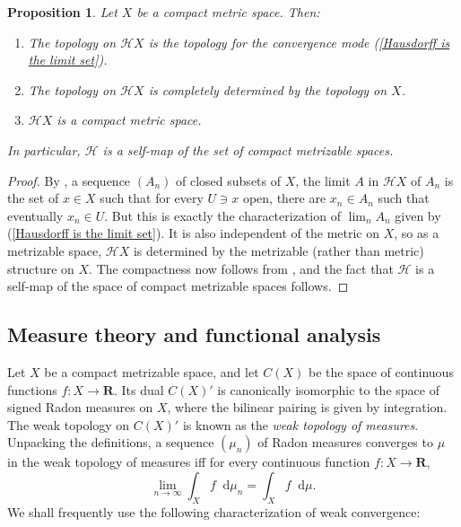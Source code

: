 \documentclass[reqno,11pt]{amsart}
\newcommand{\RR}{\mathbf{R}}
\newcommand*\dif{\mathop{}\!\mathrm{d}}
\newcommand{\Hypspace}{\mathscr H}
\newcommand{\dfn}[1]{\emph{#1}\index{#1}}
\newtheorem{proposition}[theorem]{Proposition}
\theoremstyle{definition}
\numberwithin{equation}{section}
\begin{document}
\begin{proposition}\label{Hausdorff on a CMS}
Let $X$ be a compact metric space. Then:
\begin{enumerate}
\item The topology on $\Hypspace X$ is the topology for the convergence mode (\ref{Hausdorff is the limit set}).
\item The topology on $\Hypspace X$ is completely determined by the topology on $X$.
\item $\Hypspace X$ is a compact metric space.
\end{enumerate}
In particular, $\Hypspace$ is a self-map of the set of compact metrizable spaces.
\end{proposition}
\begin{proof}
By \cite[Theorem 4.11]{nadler2017continuum}, a sequence $(A_n)$ of closed subsets of $X$, the limit $A$ in $\Hypspace X$ of $A_n$ is the set of $x \in X$ such that for every $U \ni x$ open, there are $x_n \in A_n$ such that eventually $x_n \in U$.
But this is exactly the characterization of $\lim_n A_n$ given by (\ref{Hausdorff is the limit set}).
It is also independent of the metric on $X$, so as a metrizable space, $\Hypspace X$ is determined by the metrizable (rather than metric) structure on $X$.
The compactness now follows from \cite[Theorem 4.17]{nadler2017continuum}, and the fact that $\Hypspace$ is a self-map of the space of compact metrizable spaces follows.
\end{proof}

\subsection{Measure theory and functional analysis}\label{MeasurePrelims}
Let $X$ be a compact metrizable space, and let $C(X)$ be the space of continuous functions $f: X \to \RR$.
Its dual $C(X)'$ is canonically isomorphic to the space of signed Radon measures on $X$, where the bilinear pairing is given by integration.
The weak topology on $C(X)'$ is known as the \dfn{weak topology of measures}.
Unpacking the definitions, a sequence $(\mu_n)$ of Radon measures converges to $\mu$ in the weak topology of measures iff for every continuous function $f: X \to \RR$,
$$\lim_{n \to \infty} \int_X f \dif \mu_n = \int_X f \dif \mu.$$
We shall frequently use the following characterization of weak convergence:
\end{document}
